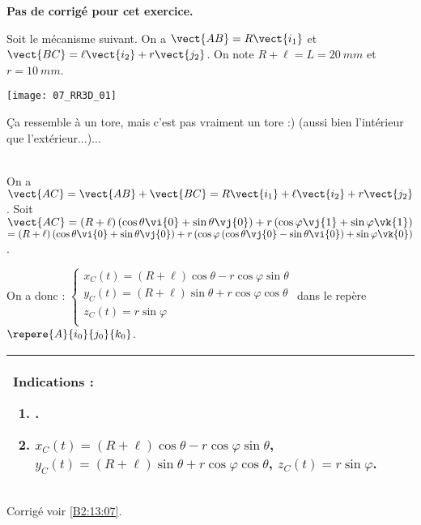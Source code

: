 \normalfalse \difficiletrue \tdifficilefalse
\correctiontrue


\setcounter{numques}{0}
\ifcorrection
\else
\textbf{Pas de corrigé pour cet exercice.}
\fi

\ifprof
\else
Soit le mécanisme suivant. On a $\vect{AB}=R\vect{i_1}$ et $\vect{BC}=\ell\vect{i_2}+r\vect{j_2}$. On note $R+\ell=L = \SI{20}{mm}$ et $r=\SI{10}{mm}$.
\begin{center}
\texttt{[image: 07\_RR3D\_01]}
\end{center}
\fi

\ifprof
Ça ressemble à un tore, mais c'est pas vraiment un tore :) (aussi bien l'intérieur que l'extérieur...)...
\else
\fi

\ifprof ~\\
On a $\vect{AC}=\vect{AB}+\vect{BC} = R\vect{i_1} + \ell\vect{i_2}+r\vect{j_2}$. 
Soit $\vect{AC} = \left(R+\ell\right)\left(\cos\theta\vi{0} + \sin\theta\vj{0}\right)  + r\left(\cos\varphi \vj{1}+\sin\varphi \vk{1}\right)$  $= \left(R+\ell\right)\left(\cos\theta\vi{0} + \sin\theta\vj{0}\right)  + r\left(\cos\varphi \left(  \cos\theta\vj{0} - \sin\theta\vi{0}\right)+\sin\varphi \vk{0}\right)$.

On a donc :
$\left\{
\begin{array}{l}
x_C(t)= \left(R+\ell\right)\cos\theta  - r\cos\varphi  \sin\theta\\
y_C(t)= \left(R+\ell\right)\sin\theta  + r\cos\varphi \cos\theta \\
z_C(t)=  r\sin\varphi \\
\end{array}
\right.
$ dans le repère $\repere{A}{i_0}{j_0}{k_0}$.
\else
\fi






\ifprof
\else
\footnotesize
\begin{center}
\begin{tabular}{|p{.9\linewidth}|}
\hline
Indications :
\begin{enumerate}
\item .
\item $x_C(t)= \left(R+\ell\right)\cos\theta  - r\cos\varphi  \sin\theta$, 
$y_C(t)= \left(R+\ell\right)\sin\theta  + r\cos\varphi \cos\theta$, 
$z_C(t)=  r\sin\varphi$.
\end{enumerate} \\ \hline
\end{tabular}
\end{center}
\normalsize

\begin{flushright}
\footnotesize{Corrigé  voir \ref{B2:13:07}.}
\end{flushright}%
\fi